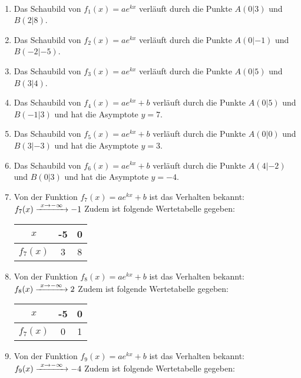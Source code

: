 \begin{minipage}{\textwidth}
	\begin{Exercise}[title={Stelle jeweils eine Funktionsgleichung vom passenden Typ auf}, label=eFktFGlAA1]\\
		\begin{minipage}[t][30cm][t]{0.49\textwidth}
			\begin{enumerate}[label=\alph*)]
				\item Das Schaubild von \(f_1(x)=ae^{kx}\) verläuft durch die Punkte \(A(0|3)\) und \(B(2|8)\).
				\item Das Schaubild von \(f_2(x)=ae^{kx}\) verläuft durch die Punkte \(A(0|-1)\) und \(B(-2|-5)\).
				\item Das Schaubild von \(f_3(x)=ae^{kx}\) verläuft durch die Punkte \(A(0|5)\) und \(B(3|4)\).
				\item Das Schaubild von \(f_4(x)=ae^{kx}+b\) verläuft durch die Punkte \(A(0|5)\) und \(B(-1|3)\) und hat die Asymptote \(y=7\).
				\item Das Schaubild von \(f_5(x)=ae^{kx}+b\) verläuft durch die Punkte \(A(0|0)\) und \(B(3|-3)\) und hat die Asymptote \(y=3\).
				\item Das Schaubild von \(f_6(x)=ae^{kx}+b\) verläuft durch die Punkte \(A(4|-2)\) und \(B(0|3)\) und hat die Asymptote \(y=-4\).
				\item Von der Funktion \(f_7(x)=ae^{kx}+b\) ist das Verhalten bekannt: \(f_7(x)\xrightarrow{\hphantom{\ }x\to-\infty\hphantom{\ }}-1\) Zudem ist folgende Wertetabelle gegeben:\\
				\begin{tabular}{c|cc}
					\(x\)&-5&0\\
					\hline
					\(f_7(x)\)&3&8\\
				\end{tabular}
				\item Von der Funktion \(f_8(x)=ae^{kx}+b\) ist das Verhalten bekannt: \(f_8(x)\xrightarrow{\hphantom{\ }x\to-\infty\hphantom{\ }}2\) Zudem ist folgende Wertetabelle gegeben:\\
				\begin{tabular}{c|cc}
					\(x\)&-5&0\\
					\hline
					\(f_7(x)\)&0&1\\
				\end{tabular}
				\item Von der Funktion \(f_9(x)=ae^{kx}+b\) ist das Verhalten bekannt: \(f_9(x)\xrightarrow{\hphantom{\ }x\to-\infty\hphantom{\ }}-4\) Zudem ist folgende Wertetabelle gegeben:\\

\end{enumerate}
\end{minipage}
\end{Exercise}
\end{minipage}
